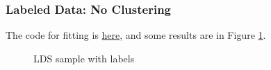 \documentclass[]{article}
\begin{document}
\subsubsection{Labeled Data: No Clustering}
The code for fitting is \href{https://github.com/weigcdsb/state-space-clustering/blob/main/LDS/lds_sample.m}{here}, and some results are in Figure \ref{fig:LDS labeled}.

\begin{figure}[h!]
	\caption{LDS sample with labels}
	\label{fig:LDS labeled}
\end{figure}
\end{document}
